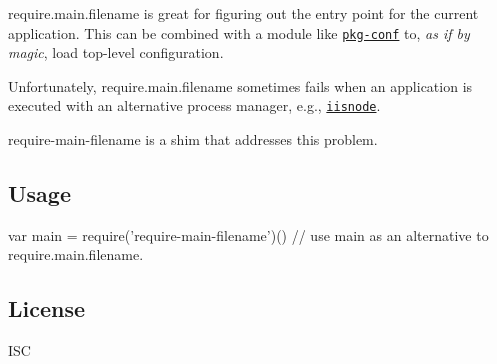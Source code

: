 \href{https://travis-ci.org/yargs/require-main-filename}{\tt } \href{https://coveralls.io/r/yargs/require-main-filename?branch=master}{\tt } \href{https://www.npmjs.com/package/require-main-filename}{\tt }

{\ttfamily require.\+main.\+filename} is great for figuring out the entry point for the current application. This can be combined with a module like \href{https://www.npmjs.com/package/pkg-conf}{\tt pkg-\/conf} to, {\itshape as if by magic}, load top-\/level configuration.

Unfortunately, {\ttfamily require.\+main.\+filename} sometimes fails when an application is executed with an alternative process manager, e.\+g., \href{https://github.com/tjanczuk/iisnode}{\tt iisnode}.

{\ttfamily require-\/main-\/filename} is a shim that addresses this problem.

\subsection*{Usage}


\begin{DoxyCode}
var main = require('require-main-filename')()
// use main as an alternative to require.main.filename.
\end{DoxyCode}


\subsection*{License}

I\+SC 